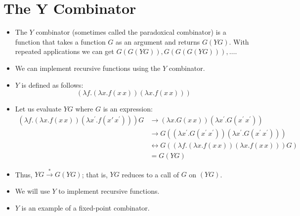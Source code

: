 \documentclass[]{article}
\begin{document}
\section{The Y Combinator}
\begin{itemize}
\item The $Y$ combinator (sometimes called the paradoxical combinator) is a function that takes a function $G$ as an argument and returns $G(YG)$. With repeated applications we can get $G(G(YG)), G(G(G(YG))),\ldots$.
\item We can implement recursive functions using the $Y$ combinator.
\item $Y$ is defined as follows:
\[(\lambda f.(\lambda x.f(x\,x))(\lambda x.f(x\,x)))\]
\item Let us evaluate $YG$ where $G$ is an expression:
\begin{align*}
(\lambda f.(\lambda x.f(x\,x))(\lambda x^\prime.f(x\prime\,x^\prime)))G &\rightarrow(\lambda x.G(x\,x))(\lambda x^\prime.G(x^\prime\,x^\prime)) \\
& \rightarrow G((\lambda x^\prime.G(x^\prime\,x^\prime))(\lambda x^\prime.G(x^\prime\,x^\prime))) \\
& \leftrightarrow G((\lambda f.(\lambda x.f(x\,x))(\lambda x.f(x\,x)))G) \\
& = G(YG)
\end{align*}
\item Thus, $YG \overset{*}{\rightarrow} G(YG)$; that is, $YG$ reduces to a call of $G$ on $(YG)$.
\item We will use $Y$ to implement recursive functions.
\item $Y$ is an example of a fixed-point combinator.
\end{itemize}
\end{document}
